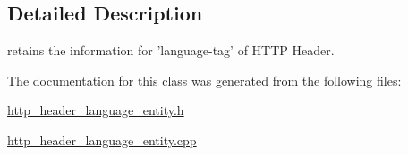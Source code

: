 \subsection{Detailed Description}
retains the information for 'language-\/tag' of H\-T\-T\-P Header. 

The documentation for this class was generated from the following files\-:\begin{DoxyCompactItemize}
\item 
\hyperlink{http__header__language__entity_8h}{http\-\_\-header\-\_\-language\-\_\-entity.\-h}\item 
\hyperlink{http__header__language__entity_8cpp}{http\-\_\-header\-\_\-language\-\_\-entity.\-cpp}\end{DoxyCompactItemize}
